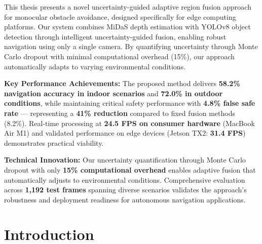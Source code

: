 \documentclass[12pt,oneside]{book}
\makeatletter
\renewcommand{\figurename}{FIGURE}
\renewcommand{\thefigure}{\Roman{figure}}
\renewcommand{\fnum@figure}{\figurename~\thefigure}
\renewcommand{\tablename}{TABLE}
\renewcommand{\thetable}{\Roman{table}}
\renewcommand{\fnum@table}{\tablename~\thetable}
\makeatother
\begin{document}
This thesis presents a novel uncertainty-guided adaptive region fusion approach for monocular obstacle avoidance, designed specifically for edge computing platforms. Our system combines MiDaS depth estimation with YOLOv8 object detection through intelligent uncertainty-guided fusion, enabling robust navigation using only a single camera. By quantifying uncertainty through Monte Carlo dropout with minimal computational overhead (15\%), our approach automatically adapts to varying environmental conditions.

\vspace{1cm}\textbf{Key Performance Achievements:} The proposed method delivers \textbf{58.2\% navigation accuracy in indoor scenarios} and \textbf{72.0\% in outdoor conditions}, while maintaining critical safety performance with \textbf{4.8\% false safe rate} — representing a \textbf{41\% reduction} compared to fixed fusion methods (8.2\%). Real-time processing at \textbf{24.5 FPS on consumer hardware} (MacBook Air M1) and validated performance on edge devices (Jetson TX2: \textbf{31.4 FPS}) demonstrates practical viability.

\textbf{Technical Innovation:} Our uncertainty quantification through Monte Carlo dropout with only \textbf{15\% computational overhead} enables adaptive fusion that automatically adjusts to environmental conditions. Comprehensive evaluation across \textbf{1,192 test frames} spanning diverse scenarios validates the approach's robustness and deployment readiness for autonomous navigation applications.

\clearpage


\tableofcontents
\clearpage

\renewcommand{\listfigurename}{LIST OF FIGURES}
\renewcommand{\figurename}{FIGURE}
\renewcommand{\thefigure}{\Roman{figure}}
\makeatletter
\renewcommand{\fnum@figure}{\figurename~\thefigure}
\makeatother

\listoffigures
\clearpage

\renewcommand{\listtablename}{LIST OF TABLES}
\renewcommand{\tablename}{TABLE}
\renewcommand{\thetable}{\Roman{table}}
\makeatletter
\renewcommand{\fnum@table}{\tablename~\thefigure}
\makeatother

\listoftables
\clearpage


\chapter{Introduction}
\end{document}
